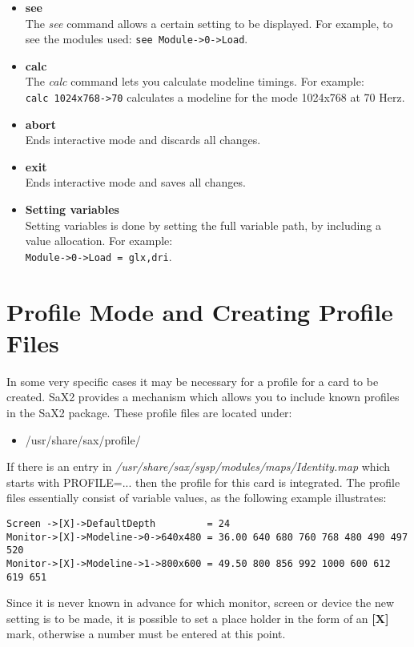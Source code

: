 \begin{appendix}
\begin{itemize}
\item  \textbf{see}\\
       The \textit{see} command allows a certain setting to be displayed. For
       example, to see the modules used: 
       \verb+see Module->0->Load+.

\item  \textbf{calc}\\
       The \textit{calc} command lets you calculate modeline timings. For
       example:\\
       \verb+calc 1024x768->70+ calculates a modeline for the mode
       1024x768 at 70 Herz.

\item  \textbf{abort}\\
       Ends interactive mode and discards all changes.

\item  \textbf{exit}\\
       Ends interactive mode and saves all changes.

\item  \textbf{Setting variables}\\
       Setting variables is done by setting the full variable path, by
       including a value allocation. For example:\\
       \verb+Module->0->Load = glx,dri+.
\end{itemize}

\section{Profile Mode and Creating Profile Files}
In some very specific cases it may be necessary for a profile for a card to be
created. SaX2 provides a mechanism which allows you to include known profiles
in the SaX2 package. These profile files are located under:\\
\begin{itemize}
\item /usr/share/sax/profile/
\end{itemize}
If there is an entry in
\textit{/usr/share/sax/sysp/modules/maps/Identity.map} 
which starts with PROFILE=... then the profile for this card is
integrated. The profile files essentially consist of variable values, as the
following example illustrates:
\begin{verbatim}
Screen ->[X]->DefaultDepth         = 24
Monitor->[X]->Modeline->0->640x480 = 36.00 640 680 760 768 480 490 497 520
Monitor->[X]->Modeline->1->800x600 = 49.50 800 856 992 1000 600 612 619 651
\end{verbatim}
Since it is never known in advance for which monitor, screen or device the new
setting is to be made, it is possible to set a place holder in the form of an  
\textbf{[X]} mark, otherwise a number must be entered at this point. 



\end{appendix}
